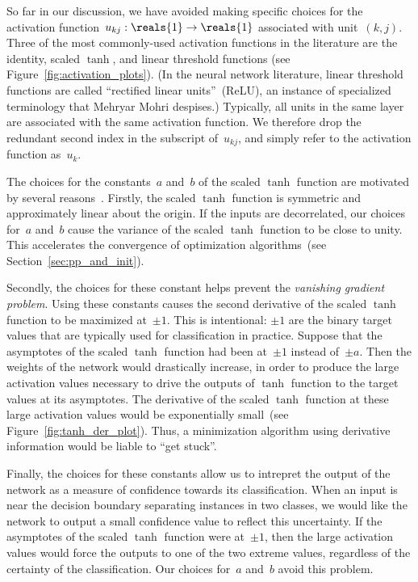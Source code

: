 \documentclass[11pt,a4paper]{article}
\numberwithin{equation}{section}
\begin{document}
So far in our discussion, we have avoided making specific choices for the
activation function~$u_{kj} : \reals{1} \to \reals{1}$ associated with unit~$(k,
j)$. Three of the most commonly-used activation functions in the literature are
the identity, scaled $\tanh$, and linear threshold functions (see
Figure~\ref{fig:activation_plots}). (In the neural network literature, linear
threshold functions are called ``rectified linear units''~(ReLU), an instance of
specialized terminology that Mehryar Mohri despises.) Typically, all units in
the same layer are associated with the same activation function. We therefore
drop the redundant second index in the subscript of~$u_{kj}$, and simply refer
to the activation function as~$u_k$.

The choices for the constants~$a$ and~$b$ of the scaled $\tanh$ function are
motivated by several reasons~\citep{lecun-98b}. Firstly, the scaled $\tanh$
function is symmetric and approximately linear about the origin. If the inputs
are decorrelated, our choices for~$a$ and~$b$ cause the variance of the scaled
$\tanh$ function to be close to unity. This accelerates the convergence of
optimization algorithms~(see Section~\ref{sec:pp_and_init}).

Secondly, the choices for these constant helps prevent the \emph{vanishing
gradient problem}. Using these constants causes the second derivative of the
scaled $\tanh$ function to be maximized at~$\pm 1$. This is intentional: $\pm 1$
are the binary target values that are typically used for classification in
practice. Suppose that the asymptotes of the scaled $\tanh$ function had been
at~$\pm 1$ instead of~$\pm a$. Then the weights of the network would drastically
increase, in order to produce the large activation values necessary to drive the
outputs of $\tanh$ function to the target values at its asymptotes.  The
derivative of the scaled $\tanh$ function at these large activation values would
be exponentially small~(see Figure~\ref{fig:tanh_der_plot}). Thus, a
minimization algorithm using derivative information would be liable to ``get
stuck''.

Finally, the choices for these constants allow us to intrepret the output of the
network as a measure of confidence towards its classification. When an input is
near the decision boundary separating instances in two classes, we would like
the network to output a small confidence value to reflect this uncertainty. If
the asymptotes of the scaled $\tanh$ function were at~$\pm 1$, then the large
activation values would force the outputs to one of the two extreme values,
regardless of the certainty of the classification. Our choices for~$a$ and~$b$
avoid this problem.
\end{document}
